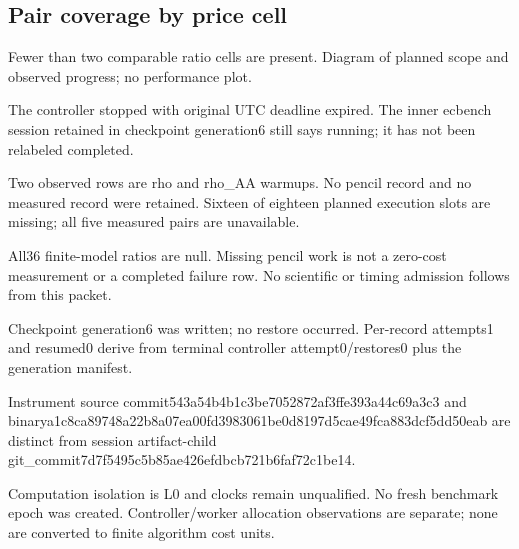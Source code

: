 \documentclass[10pt]{article}
\begin{document}
\subsection*{Pair coverage by price cell}
\par
Fewer than two comparable ratio cells are present. Diagram of planned scope and observed progress; no performance plot.\par
The controller stopped with original UTC deadline expired. The inner ecbench session retained in checkpoint generation6 still says running; it has not been relabeled completed.\par
Two observed rows are rho and rho\_AA warmups. No pencil record and no measured record were retained. Sixteen of eighteen planned execution slots are missing; all five measured pairs are unavailable.\par
All36 finite-model ratios are null. Missing pencil work is not a zero-cost measurement or a completed failure row. No scientific or timing admission follows from this packet.\par
Checkpoint generation6 was written; no restore occurred. Per-record attempts1 and resumed0 derive from terminal controller attempt0/restores0 plus the generation manifest.\par
Instrument source commit543a54b4b1c3be7052872af3ffe393a44c69a3c3 and binarya1c8ca89748a22b8a07ea00fd3983061be0d8197d5cae49fca883dcf5dd50eab are distinct from session artifact-child git\_commit7d7f5495c5b85ae426efdbcb721b6faf72c1be14.\par
Computation isolation is L0 and clocks remain unqualified. No fresh benchmark epoch was created. Controller/worker allocation observations are separate; none are converted to finite algorithm cost units.\par
\end{document}
